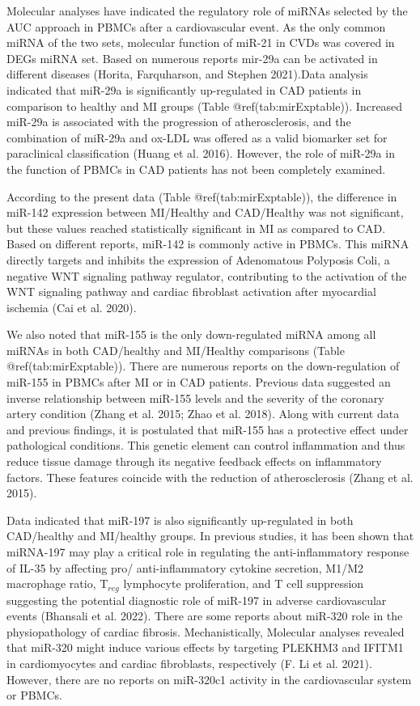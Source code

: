 \documentclass[smallextended]{svjour3}       %
\begin{document}
Molecular analyses have indicated the regulatory role of miRNAs selected
by the AUC approach in PBMCs after a cardiovascular event. As the only
common miRNA of the two sets, molecular function of miR-21 in CVDs was
covered in DEGs miRNA set. Based on numerous reports mir-29a can be
activated in different diseases (Horita, Farquharson, and Stephen
2021).Data analysis indicated that miR-29a is significantly up-regulated
in CAD patients in comparison to healthy and MI groups (Table
@ref(tab:mirExptable)). Increased miR-29a is associated with the
progression of atherosclerosis, and the combination of miR-29a and
ox-LDL was offered as a valid biomarker set for paraclinical
classification (Huang et al. 2016). However, the role of miR-29a in the
function of PBMCs in CAD patients has not been completely examined.

According to the present data (Table @ref(tab:mirExptable)), the
difference in miR-142 expression between MI/Healthy and CAD/Healthy was
not significant, but these values reached statistically significant in
MI as compared to CAD. Based on different reports, miR-142 is commonly
active in PBMCs. This miRNA directly targets and inhibits the expression
of Adenomatous Polyposis Coli, a negative WNT signaling pathway
regulator, contributing to the activation of the WNT signaling pathway
and cardiac fibroblast activation after myocardial ischemia (Cai et al.
2020).

We also noted that miR-155 is the only down-regulated miRNA among all
miRNAs in both CAD/healthy and MI/Healthy comparisons (Table
@ref(tab:mirExptable)). There are numerous reports on the
down-regulation of miR-155 in PBMCs after MI or in CAD patients.
Previous data suggested an inverse relationship between miR-155 levels
and the severity of the coronary artery condition (Zhang et al. 2015;
Zhao et al. 2018). Along with current data and previous findings, it is
postulated that miR-155 has a protective effect under pathological
conditions. This genetic element can control inflammation and thus
reduce tissue damage through its negative feedback effects on
inflammatory factors. These features coincide with the reduction of
atherosclerosis (Zhang et al. 2015).

Data indicated that miR-197 is also significantly up-regulated in both
CAD/healthy and MI/healthy groups. In previous studies, it has been
shown that miRNA-197 may play a critical role in regulating the
anti-inflammatory response of IL-35 by affecting pro/ anti-inflammatory
cytokine secretion, M1/M2 macrophage ratio, T\(_{reg}\) lymphocyte
proliferation, and T cell suppression suggesting the potential
diagnostic role of miR-197 in adverse cardiovascular events (Bhansali et
al. 2022). There are some reports about miR-320 role in the
physiopathology of cardiac fibrosis. Mechanistically, Molecular analyses
revealed that miR-320 might induce various effects by targeting PLEKHM3
and IFITM1 in cardiomyocytes and cardiac fibroblasts, respectively (F.
Li et al. 2021). However, there are no reports on miR-320c1 activity in
the cardiovascular system or PBMCs.
\end{document}
